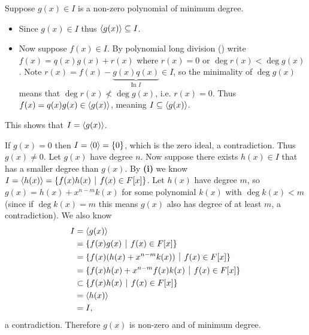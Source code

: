 \begin{questions}
    \item \begin{partquestions}{\roman*}
        \item Suppose $g(x) \in I$ is a non-zero polynomial of minimum degree.
        \begin{itemize}
            \item Since $g(x) \in I$ thus $\left\langle g(x)\right\rangle \subseteq I$.
            \item Now suppose $f(x) \in I$. By polynomial long division () write $f(x) = q(x)g(x) + r(x)$ where $r(x) = 0$ or $\deg r(x) < \deg g(x)$. Note $r(x) = f(x) - \underbrace{g(x)q(x)}_{\text{In }I} \in I$, so the minimality of $\deg g(x)$ means that $\deg r(x) \not< \deg g(x)$, i.e. $r(x) = 0$. Thus $f(x) = q(x)g(x) \in \left\langle g(x)\right\rangle$, meaning $I \subseteq \left\langle g(x)\right\rangle$.
        \end{itemize}
        This shows that $I = \left\langle g(x)\right\rangle$.

        \item If $g(x) = 0$ then $I = \left\langle0\right\rangle = \{0\}$, which is the zero ideal, a contradiction. Thus $g(x) \neq 0$. Let $g(x)$ have degree $n$. Now suppose there exists $h(x) \in I$ that has a smaller degree than $g(x)$. By \textbf{(i)} we know $I = \princ{h(x)} = \{f(x)h(x) \vert f(x) \in F[x]\}$. Let $h(x)$ have degree $m$, so $g(x) = h(x) + x^{n-m}k(x)$ for some polynomial $k(x)$ with $\deg k(x) < m$ (since if $\deg k(x) = m$ this means $g(x)$ also has degree of at least $m$, a contradiction). We also know
        \begin{align*}
            I &= \princ{g(x)}\\
            &= \{f(x)g(x) \vert f(x) \in F[x]\}\\
            &= \{f(x)(h(x) + x^{n-m}k(x)) \vert f(x) \in F[x]\}\\
            &= \{f(x)h(x) + x^{n-m}f(x)k(x) \vert f(x) \in F[x]\}\\
            &\subset \{f(x)h(x) \vert f(x) \in F[x]\}\\
            &= \princ{h(x)}\\
            &= I,
        \end{align*}
        a contradiction. Therefore $g(x)$ is non-zero and of minimum degree.
    \end{partquestions}


\end{questions}

